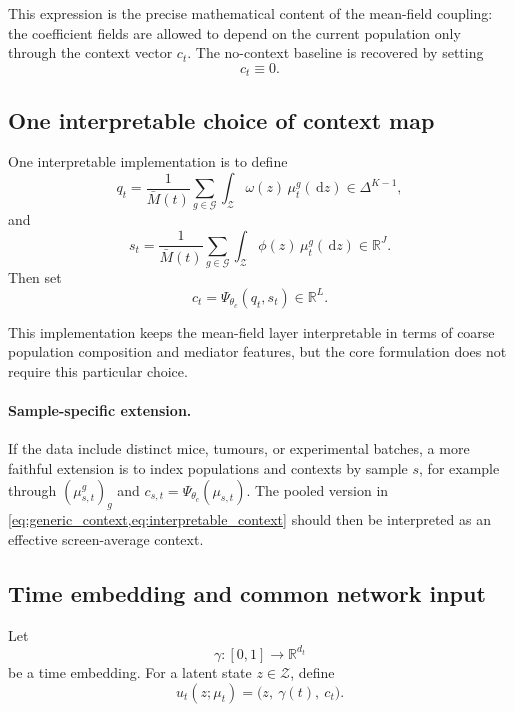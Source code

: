 \documentclass[11pt]{article}
\newcommand{\R}{\mathbb{R}}
\newcommand{\dd}{\,\mathrm{d}}
\newcommand{\Gcal}{\mathcal{G}}
\newcommand{\Zcal}{\mathcal{Z}}
\newcommand{\simplex}{\Delta}
\begin{document}
This expression is the precise mathematical content of the mean-field coupling: the coefficient fields are allowed to depend on the current population only through the context vector $c_t$. The no-context baseline is recovered by setting
\[
c_t \equiv 0.
\]

\subsection{One interpretable choice of context map}

One interpretable implementation is to define
\begin{equation}
q_t
=
\frac{1}{\bar M(t)}
\sum_{g\in\Gcal}
\int_{\Zcal}\omega(z)\,\mu_t^g(\dd z)
\in \simplex^{K-1},
\label{eq:q_t}
\end{equation}
and
\begin{equation}
s_t
=
\frac{1}{\bar M(t)}
\sum_{g\in\Gcal}
\int_{\Zcal}\phi(z)\,\mu_t^g(\dd z)
\in \R^J.
\label{eq:s_t}
\end{equation}
Then set
\begin{equation}
c_t = \Psi_{\theta_c}(q_t,s_t)\in\R^L.
\label{eq:interpretable_context}
\end{equation}

This implementation keeps the mean-field layer interpretable in terms of coarse population composition and mediator features, but the core formulation does not require this particular choice.

\paragraph{Sample-specific extension.}
If the data include distinct mice, tumours, or experimental batches, a more faithful extension is to index populations and contexts by sample $s$, for example through $(\mu_{s,t}^g)_g$ and $c_{s,t}=\Psi_{\theta_c}(\mu_{s,t})$. The pooled version in \cref{eq:generic_context,eq:interpretable_context} should then be interpreted as an effective screen-average context.

\subsection{Time embedding and common network input}

Let
\[
\gamma : [0,1] \to \R^{d_t}
\]
be a time embedding. For a latent state $z\in\Zcal$, define
\begin{equation}
u_t(z;\mu_t)
=
\big(z,\ \gamma(t),\ c_t\big).
\label{eq:context_vector}
\end{equation}
\end{document}
